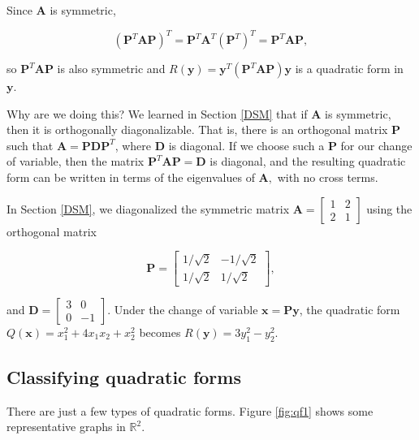 \documentclass[
]{book}
\theoremstyle{definition}
\theoremstyle{definition}
\theoremstyle{definition}
\theoremstyle{definition}
\theoremstyle{remark}
\begin{document}
Since \(\mathbf{A}\) is symmetric,

\[(\mathbf{P}^T\mathbf{A}\mathbf{P})^T=\mathbf{P}^T\mathbf{A}^T(\mathbf{P}^T)^T=\mathbf{P}^T\mathbf{A}\mathbf{P},\]

so \(\mathbf{P}^T\mathbf{A}\mathbf{P}\) is also symmetric and \(R(\mathbf{y})=\mathbf{y}^T(\mathbf{P}^T\mathbf{A}\mathbf{P})\mathbf{y}\) is a quadratic form in \(\mathbf{y}.\)

Why are we doing this? We learned in Section \ref{DSM} that if \(\mathbf{A}\) is symmetric, then it is orthogonally diagonalizable. That is, there is an orthogonal matrix \(\mathbf{P}\) such that \(\mathbf{A}=\mathbf{P}\mathbf{D}\mathbf{P}^T\), where \(\mathbf{D}\) is diagonal. If we choose such a \(\mathbf{P}\) for our change of variable, then the matrix \(\mathbf{P}^T\mathbf{A}\mathbf{P}=\mathbf{D}\) is diagonal, and the resulting quadratic form can be written in terms of the eigenvalues of \(\mathbf{A},\) with no cross terms.

In Section \ref{DSM}, we diagonalized the symmetric matrix \(\mathbf{A}=\begin{bmatrix}1 & 2\\2 & 1\end{bmatrix}\) using the orthogonal matrix

\[\mathbf{P}=\begin{bmatrix} 1/\sqrt{2} & -1/\sqrt{2}\\1/\sqrt{2} & 1/\sqrt{2}\end{bmatrix},\]

and \(\mathbf{D}=\begin{bmatrix}3 & 0\\0 & -1\end{bmatrix}\). Under the change of variable \(\mathbf{x}=\mathbf{P}\mathbf{y}\), the quadratic form \(Q(\mathbf{x})=x_1^2+4x_1x_2+x_2^2\) becomes \(R(\mathbf{y})=3y_1^2-y_2^2\).

\subsection*{Classifying quadratic forms}\label{classifying-quadratic-forms}

There are just a few types of quadratic forms. Figure \ref{fig:qf1} shows some representative graphs in \(\mathbb{R}^2\).
\end{document}
